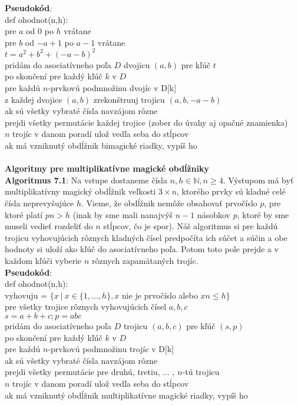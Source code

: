 \documentclass[12pt]{article}
\begin{document}
\textbf{Pseudokód}: \\
def ohodnot(n,h): \\
pre $a$ od $0$ po $h$ vrátane \\
pre $b$ od $-a+1$ po $a-1$ vrátane \\
$t = a^2 + b^2 + (-a-b)^2$ \\
pridám do asociatívneho poľa $D$ dvojicu $(a,b)$ pre kľúč $t$ \\
po skončení pre každý kľúč $k$ v $D$ \\
pre každú $n$-prvkovú podmnožinu dvojíc v D[k] \\
z každej dvojice $(a,b)$ zrekonštruuj trojicu $(a,b,-a-b)$ \\
ak sú všetky vybraté čísla navzájom rôzne \\
prejdi všetky permutácie každej trojice (zober do úvahy aj opačné znamienka) \\
$n$ trojíc v danom poradí ulož vedľa seba do stĺpcov \\
ak má vzniknutý obdĺžnik bimagické riadky, vypíš ho \\\\

\textbf{Algoritmy pre multiplikatívne magické obdĺžniky} \\

\textbf{Algoritmus 7.1}: Na vstupe dostaneme čísla $n,h \in \mathbb{N}, n \geq 4$. Výstupom má byť multiplikatívny magický obdĺžnik veľkosti $3 \times n$, ktorého prvky sú kladné celé čísla neprevyšujúce $h$. Vieme, že obdĺžnik nemôže obsahovať prvočíslo $p$, pre ktoré platí $pn > h$ (inak by sme mali nanajvýš $n-1$ násobkov $p$, ktoré by sme museli vedieť rozdeliť do $n$ stĺpcov, čo je spor). Náš algoritmus si pre každú trojicu vyhovujúcich rôznych kladných čísel predpočíta ich súčet a súčin a obe hodnoty si uloží ako kľúč do asociatívneho poľa. Potom toto pole prejde a v každom kľúči vyberie $n$ rôznych zapamätaných trojíc. \\

\textbf{Pseudokód}: \\
def ohodnot(n,h): \\
vyhovuju = $ \{x ~|~ x \in \{1, ... , h\}, x$ nie je prvočíslo alebo $xn \leq h\}$ \\
pre všetky trojice rôznych vyhovujúcich čísel $a,b,c$ \\
$s = a+b+c; p = abc$ \\
pridám do asociatívneho poľa $D$ trojicu $(a,b,c)$ pre kľúč $(s,p)$ \\
po skončení pre každý kľúč $k$ v $D$ \\
pre každú $n$-prvkovú podmnožinu trojíc v D[k] \\
ak sú všetky vybraté čísla navzájom rôzne \\
prejdi všetky permutácie pre druhú, tretiu, ... , $n$-tú trojicu \\
$n$ trojíc v danom poradí ulož vedľa seba do stĺpcov \\
ak má vzniknutý obdĺžnik multiplikatívne magické riadky, vypíš ho \\
\end{document}
